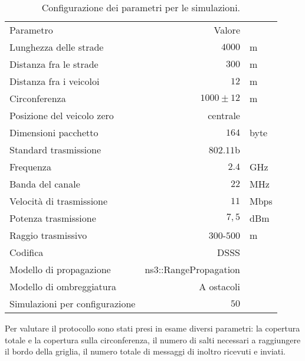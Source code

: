 \begin{table}[!h]
	\centering
	\begin{tabular}{| L{.4\linewidth} | r  l |}
		\toprule
		Parametro															&			Valore 							&					\\
		\thickerline
		Lunghezza delle strade								&			$4000$							& m				\\
		Distanza fra le strade								&			$300$								& m				\\
		Distanza fra i veicoloi								&			$12$ 								& m				\\
		Circonferenza													&			$1000\pm12$					& m				\\
		Posizione del veicolo zero						&			centrale						&					\\
		\thickerline
		Dimensioni pacchetto									&				$164$							&			byte		\\	\hline
		Standard trasmissione									&				$802.11$b					&							\\	\hline
		Frequenza															&				$2.4$							&			GHz			\\	\hline
		Banda del canale											&				$22$							&			MHz			\\	\hline
		Velocità di trasmissione							&				$11$							&			Mbps		\\	\hline
		Potenza trasmissione									&				$7,5$							&			dBm			\\	\hline
		Raggio trasmissivo										&				$300$-$500$				&			m				\\	\hline
		Codifica															&				DSSS\footnotemark	&							\\	\hline
		Modello di propagazione								&				\textsf{ns3::RangePropagation}	&							\\	\hline
		Modello di ombreggiatura							&				A ostacoli				&							\\	\hline
		\thickerline
		Simulazioni	per configurazione				&			$50$								&					\\
		\bottomrule
	\end{tabular}
	\caption{Configurazione dei parametri per le simulazioni.\label{tab:parametri-simulazioni-barichello}}
\end{table}
%
Per valutare il protocollo sono stati presi in esame diversi parametri: la copertura totale e la copertura sulla circonferenza,
il numero di salti necessari a raggiungere il bordo della griglia, il numero totale di messaggi di inoltro ricevuti e inviati.
